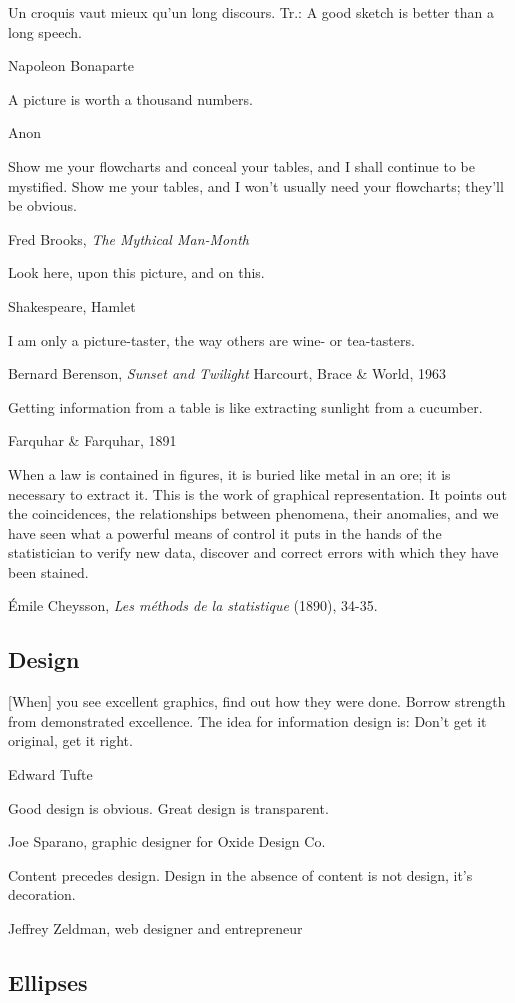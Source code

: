 \epigraph{Un croquis vaut mieux qu'un long discours. Tr.: A good sketch is better than a long speech.}{Napoleon Bonaparte}

\epigraph{A picture is worth a thousand numbers.}{Anon}

\epigraph{Show me your flowcharts and conceal your tables, and I shall continue to be mystified. Show me your tables, and I won’t usually need your flowcharts; they’ll be obvious.}{Fred Brooks, \emph{The Mythical Man-Month}}

\epigraph{Look here, upon this picture, and on this.}{Shakespeare, Hamlet}


\epigraph{I am only a picture-taster, the way others are wine- or tea-tasters.}{Bernard Berenson, \emph{Sunset and Twilight} Harcourt, Brace \& World, 1963}

\epigraph{Getting information from a table is like extracting sunlight from a cucumber.}{Farquhar \& Farquhar, 1891} %

\epigraph{When a law is contained in figures, it is buried like metal in an ore; it is necessary to extract it.  This is the work of graphical representation. It points out the coincidences, the relationships between phenomena, their anomalies, and we have seen what a powerful means of control it puts in the hands of the statistician to verify new data, discover and correct errors with which they have been stained.}{\'Emile Cheysson, \emph{Les m\'ethods de la statistique} (1890), 34-35.}

\subsection{Design}

\epigraph{[When] you see excellent graphics, find out how they were done. Borrow strength from demonstrated excellence.  The idea for information design is: Don't get it original, get it right.}{Edward Tufte}

\epigraph{Good design is obvious. Great design is transparent.}{Joe Sparano, graphic designer for Oxide Design Co.}

\epigraph{Content precedes design. Design in the absence of content is not design, it’s decoration.}{Jeffrey Zeldman, web designer and entrepreneur}

\subsection{Ellipses}

